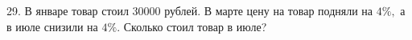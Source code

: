 29. В январе товар стоил 30000 рублей. В марте цену на товар подняли на $4\%,$ а в июле снизили на $4\%.$ Сколько стоил товар в июле?\\
